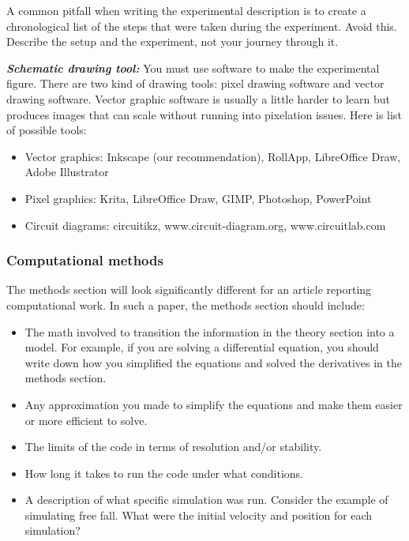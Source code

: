\documentclass[12pt]{article}
\begin{document}
A common pitfall when writing the experimental description is to
create a chronological list of the steps that were taken during the
experiment. Avoid this. Describe the setup and the experiment, not
your journey through it.

\textit{\textbf{Schematic drawing tool:}} You must use software to
make the experimental figure. There are two kind of drawing tools:
pixel drawing software and vector drawing software. Vector graphic
software is usually a little harder to learn but produces images that
can scale without running into pixelation issues. Here is list of
possible tools:

\begin{itemize}[label=-]
 \item Vector graphics: Inkscape (our recommendation), RollApp, LibreOffice Draw,
 Adobe Illustrator
 \item Pixel graphics: Krita, LibreOffice Draw, GIMP, Photoshop, PowerPoint
 \item Circuit diagrams: circuitikz, www.circuit-diagram.org, www.circuitlab.com
\end{itemize}

\subsubsection{Computational methods}

The methods section will look significantly different for an article
reporting computational work. In such a paper, the methods section
should include:

\begin{itemize}
\item The math involved to transition the information in the theory
  section into a model. For example, if you are solving a differential
  equation, you should write down how you simplified the equations and
  solved the derivatives in the methods section.
\item Any approximation you made to simplify the equations and make
  them easier or more efficient to solve.
\item The limits of the code in terms of resolution and/or stability.
\item How long it takes to run the code under what conditions.
\item A description of what specific simulation was run. Consider the
  example of simulating free fall. What were the initial velocity and
  position for each simulation?
\end{itemize}
\end{document}
